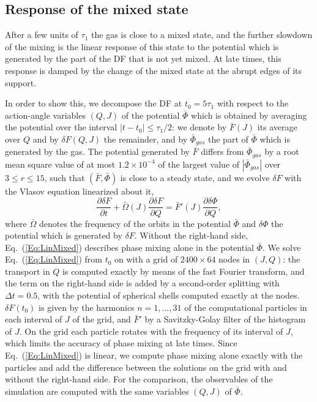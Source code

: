 \subsection{Response of the mixed state}
\label{SubSec:RatesResponse}

After a few units of $\tau_1$ the gas is close to a mixed state, and the further slowdown of the mixing is the linear response of this state to the potential which is generated by the part of the DF that is not yet mixed. At late times, this response is damped by the change of the mixed state at the abrupt edges of its support.

In order to show this, we decompose the DF at $t_0 = 5\tau_1$ with respect to the action-angle variables $(Q,J)$ of the potential $\bar{\Phi}$ which is obtained by averaging the potential over the interval $|t - t_0|\leq\tau_1/2$: we denote by $\bar{F}(J)$ its average over $Q$ and by $\delta F(Q,J)$ the remainder, and by $\bar{\Phi}_{gas}$ the part of $\bar{\Phi}$ which is generated by the gas. The potential generated by $\bar{F}$ differs from $\bar{\Phi}_{gas}$ by a root mean square value of at most $1.2\times 10^{-4}$ of the largest value of $|\bar{\Phi}_{gas}|$ over $3\leq r\leq 15$, such that $(\bar{F},\bar{\Phi})$ is close to a steady state, and we evolve $\delta F$ with the Vlasov equation linearized about it,
\begin{equation}
\frac{\partial\delta F}{\partial t} + \bar{\Omega}(J)\frac{\partial\delta F}{\partial Q} = \bar{F}'(J)\frac{\partial\delta\Phi}{\partial Q},
\label{Eq:LinMixed}
\end{equation}
where $\bar{\Omega}$ denotes the frequency of the orbits in the potential $\bar{\Phi}$ and $\delta\Phi$ the potential which is generated by $\delta F$. Without the right-hand side, Eq.~(\ref{Eq:LinMixed}) describes phase mixing alone in the potential $\bar{\Phi}$. We solve Eq.~(\ref{Eq:LinMixed}) from $t_0$ on with a grid of $2400\times 64$ nodes in $(J,Q)$: the transport in $Q$ is computed exactly by means of the fast Fourier transform, and the term on the right-hand side is added by a second-order splitting with $\Delta t = 0.5$, with the potential of spherical shells computed exactly at the nodes. $\delta F(t_0)$ is given by the harmonics $n = 1,\ldots,31$ of the computational particles in each interval of $J$ of the grid, and $\bar{F}'$ by a Savitzky-Golay filter of the histogram of $J$. On the grid each particle rotates with the frequency of its interval of $J$, which limits the accuracy of phase mixing at late times. Since Eq.~(\ref{Eq:LinMixed}) is linear, we compute phase mixing alone exactly with the particles and add the difference between the solutions on the grid with and without the right-hand side. For the comparison, the observables of the simulation are computed with the same variables $(Q,J)$ of $\bar{\Phi}$.

